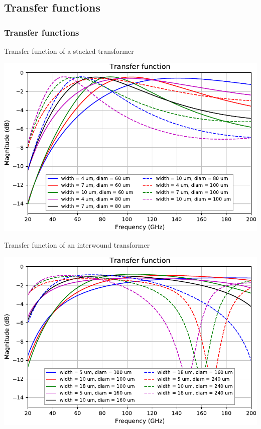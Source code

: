 \documentclass{sdkslides}
\begin{document}
\renewcommand{\sectionname}{Transfer functions}
\subsection*{\sectionname}
\begin{frame}[c]
    \frametitle{\sectionname}
    \begin{minipage}[t]{0.48\textwidth}
        \vskip 0pt
        \begin{block}{Transfer function of a stacked transformer}
            \begin{center}
                \includegraphics[width=\textwidth]{./Pics/diff_S21_stacked_TF_diam_width_sweep_3.pdf}
            \end{center}
        \end{block}
    \end{minipage}\hfill
    \begin{minipage}[t]{0.48\textwidth}
        \vskip 0pt
        \begin{block}{Transfer function of an interwound transformer}
            \begin{center}
                \includegraphics[width=\textwidth]{./Pics/diff_S21_int_TF_diam_width_sweep_3.pdf}
            \end{center}
        \end{block}
    \end{minipage}
\end{frame}
\end{document}
